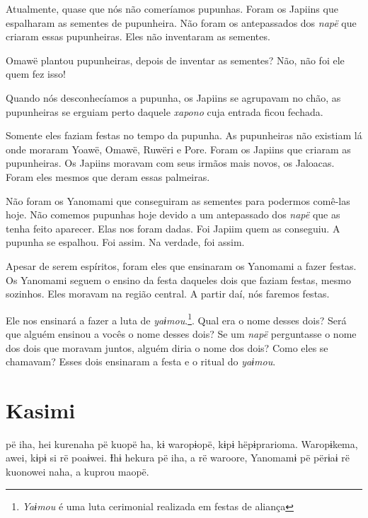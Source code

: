 Atualmente, quase que nós não comeríamos pupunhas. Foram os Japiins que
espalharam as sementes de pupunheira. Não foram os antepassados
dos \textit{napë} que criaram essas pupunheiras. Eles não inventaram as
sementes. 

Omawë plantou pupunheiras, depois de inventar as sementes? Não, não foi
ele quem fez isso!

Quando nós desconhecíamos a pupunha, os Japiins se agrupavam no chão, as
pupunheiras se erguiam perto daquele \textit{xapono} cuja entrada ficou fechada. 

Somente eles faziam festas no tempo da pupunha. As pupunheiras não
existiam lá onde moraram Yoawë, Omawë, Ruwëri e Pore. Foram os Japiins
que criaram as pupunheiras. Os Japiins moravam com seus irmãos mais
novos, os Jaloacas. Foram eles mesmos que deram essas palmeiras. 

Não foram os Yanomami que conseguiram as sementes para podermos comê-las
hoje. Não comemos pupunhas hoje devido a um antepassado
dos \textit{napë} que as tenha feito aparecer. Elas nos foram
dadas. Foi Japiim quem as conseguiu. A pupunha se espalhou. Foi
assim. Na verdade, foi assim. 

Apesar de serem espíritos, foram eles que ensinaram os Yanomami a fazer
festas. Os Yanomami seguem o ensino da festa daqueles dois que faziam
festas, mesmo sozinhos. Eles moravam na região central. A partir daí,
nós faremos festas. 

Ele nos ensinará a fazer a luta de \textit{yaɨmou}.\footnote{\textit{Yaɨmou} é uma luta cerimonial realizada em festas de aliança}. Qual era o nome
desses dois? Será que alguém ensinou a vocês o nome desses dois? Se
um \textit{napë} perguntasse o nome dos dois que moravam juntos, alguém
diria o nome dos dois? Como eles se chamavam? Esses dois
ensinaram a festa e o ritual do \textit{yaɨmou}. 

\chapter{Kasimi}
 
 pë iha, hei kurenaha pë kuopë ha, kɨ waropɨopë, kɨpɨ
hëpɨprarioma. Waropɨkema, awei, kɨpɨ si rë poaɨwei. Ɨhɨ hekura pë iha, a
rë waroore, Yanomamɨ pë përɨaɨ rë kuonowei naha, a kuprou maopë. 


